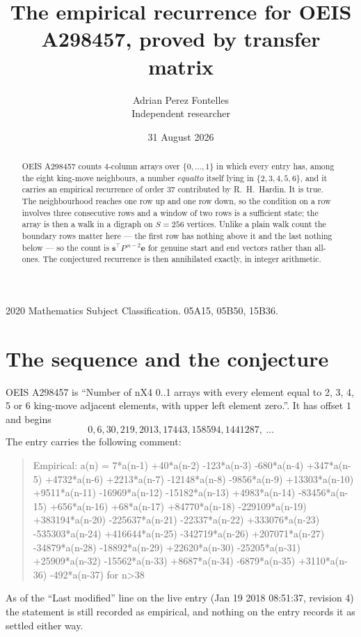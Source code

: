 \documentclass[11pt,a4paper]{article}
\title{The empirical recurrence for OEIS A298457, proved by transfer matrix}
\author{Adrian Perez Fontelles\\ \small Independent researcher}
\date{31 August 2026}
\theoremstyle{plain}
\theoremstyle{definition}
\begin{document}
\maketitle

\begin{abstract}
OEIS A298457 counts $4$-column arrays over $\{0,\dots,1\}$ in which every entry has,
among the eight king-move neighbours, a number $equal to$ itself lying in $\{2,3,4,5,6\}$, and it carries an empirical
recurrence of order $37$ contributed by R.~H.~Hardin. It is true. The neighbourhood
reaches one row up and one row down, so the condition on a row involves three consecutive
rows and a window of two rows is a sufficient state; the array is then a walk in a digraph
on $S=256$ vertices. Unlike a plain walk count the boundary rows matter here --- the first
row has nothing above it and the last nothing below --- so the count is
$\mathbf{s}^{\!\top}P^{\,n-2}\mathbf{e}$ for genuine start and end vectors rather than
all-ones. The conjectured recurrence is then annihilated exactly, in integer arithmetic.
\end{abstract}

\noindent\small 2020 Mathematics Subject Classification. 05A15, 05B50, 15B36.\normalsize

\section{The sequence and the conjecture}

OEIS A298457 is ``Number of nX4 0..1 arrays with every element equal to 2, 3, 4, 5 or 6 king-move adjacent elements, with upper left element zero.''. It has offset
$1$ and begins
\[
0, 6, 30, 219, 2013, 17443, 158594, 1441287,\ \dots
\]
The entry carries the following comment:
\begin{quote}\small
Empirical: a(n) = 7*a(n-1) +40*a(n-2) -123*a(n-3) -680*a(n-4) +347*a(n-5) +4732*a(n-6) +2213*a(n-7) -12148*a(n-8) -9856*a(n-9) +13303*a(n-10) +9511*a(n-11) -16969*a(n-12) -15182*a(n-13) +4983*a(n-14) -83456*a(n-15) +656*a(n-16) +68*a(n-17) +84770*a(n-18) -229109*a(n-19) +383194*a(n-20) -225637*a(n-21) -22337*a(n-22) +333076*a(n-23) -535303*a(n-24) +416644*a(n-25) -342719*a(n-26) +207071*a(n-27) -34879*a(n-28) -18892*a(n-29) +22620*a(n-30) -25205*a(n-31) +25909*a(n-32) -15562*a(n-33) +8687*a(n-34) -6879*a(n-35) +3110*a(n-36) -492*a(n-37) for n>38
\end{quote}
As of the ``Last modified'' line on the live entry (Jan 19 2018 08:51:37, revision
4) the statement is still recorded as empirical, and nothing on the entry
records it as settled either way.
\end{document}
